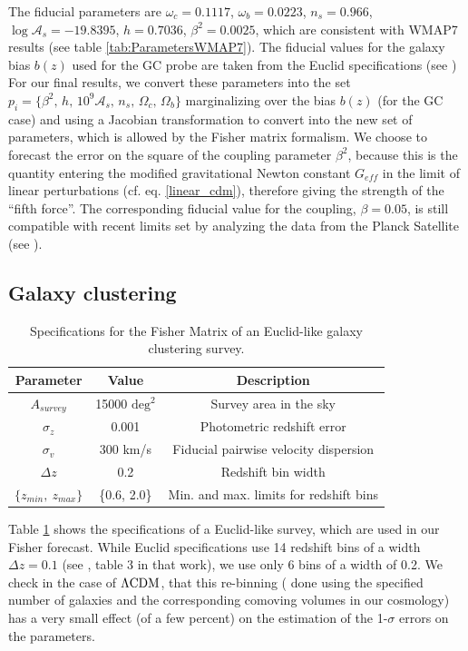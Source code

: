 The fiducial parameters are $\omega_{c}=0.1117$, $\omega_{b}=0.0223$,
$n_{s}=0.966$, $\log\mathcal{A}_{s}=-19.8395$, $h=0.7036$, $\beta^{2}=0.0025$,
which are consistent with WMAP7 results (see table \ref{tab:ParametersWMAP7}).
The fiducial values for the galaxy bias $b(z)$ used for the GC probe
are taken from the Euclid specifications (see \cite{amendola_cosmology_2012-short,laureijs_euclid_2011,orsi2010probing})
For our final results, we convert these parameters into the set $p_{i}=\{\beta^{2},\, h,\,10^{9}\mathcal{A}_{s},\, n_{s},\,\Omega_{c},\,\Omega_{b}\}$
marginalizing over the bias $b(z)$ (for the GC case) and using a
Jacobian transformation to convert into the new set of parameters,
which is allowed by the Fisher matrix formalism. We choose to forecast
the error on the square of the coupling parameter $\beta^{2}$, because
this is the quantity entering the modified gravitational Newton constant
$G_{eff}$ in the limit of linear perturbations (cf. eq. \ref{linear_cdm}),
therefore giving the strength of the ``fifth force''. The corresponding
fiducial value for the coupling, $\beta=0.05$, is still compatible
with recent limits set by analyzing the data from the Planck Satellite
(see \cite{pettorino_testing_2013,planckcollaboration_planck2015_2015}).


\subsection{Galaxy clustering}

\begin{table}
\centering{}%
\begin{tabular}{|c|c|c|}
\hline 
\textbf{Parameter}  & \textbf{Value}  & \textbf{Description}\tabularnewline
\hline 
$A_{survey}$  & 15000 $\mbox{deg}^{2}$  & Survey area in the sky\tabularnewline
$\sigma_{z}$  & 0.001  & Photometric redshift error\tabularnewline
$\sigma_{v}$  & 300 km/s  & Fiducial pairwise velocity dispersion\tabularnewline
$\Delta z$  & 0.2  & Redshift bin width\tabularnewline
$\{z_{min},\ z_{max}\}$  & \{0.6, 2.0\}  & Min. and max. limits for redshift bins \tabularnewline
\hline 
\end{tabular}\protect\protect
\caption[Specifications for a Euclid GC survey forecast.]{\label{tab:GC-specifications} Specifications for the Fisher Matrix
of an Euclid-like galaxy clustering survey.}
\end{table}


Table \ref{tab:GC-specifications} shows the specifications of a Euclid-like
survey, which are used in our Fisher forecast. While Euclid specifications
use 14 redshift bins of a width $\Delta z=0.1$ (see \cite{amendola_cosmology_2012-short},
table 3 in that work), we use only 6 bins of a width of 0.2. We check
in the case of $\Lambda\mathrm{CDM}$, that this re-binning ( done using the specified
number of galaxies and the corresponding comoving volumes in our cosmology)
has a very small effect (of a few percent) on the estimation of the
1-$\sigma$ errors on the parameters.

